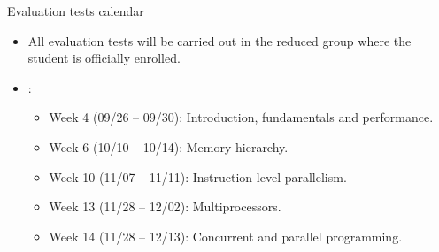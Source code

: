 \begin{frame}[t]{Evaluation tests calendar}
\begin{itemize}
  \item All evaluation tests will be carried out in the reduced group
        where the student is officially enrolled.

  \vfill
  \item {}:
  \begin{itemize}
    \item Week 4 (09/26 -- 09/30): Introduction, fundamentals and performance.
    \item Week 6 (10/10 -- 10/14): Memory hierarchy.
    \item Week 10 (11/07 -- 11/11): Instruction level parallelism.
    \item Week 13 (11/28 -- 12/02): Multiprocessors.
    \item Week 14 (11/28 -- 12/13): Concurrent and parallel programming.
  \end{itemize}
\end{itemize}
\end{frame}


